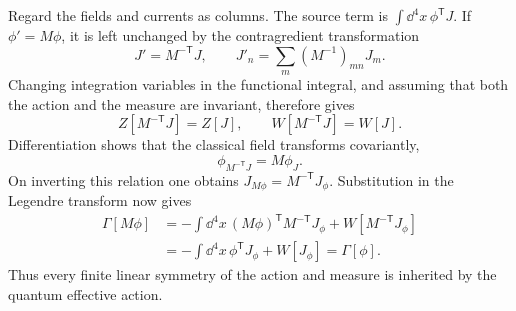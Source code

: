 \begin{enumerate}
  Regard the fields and currents as columns.  The source term is
  \(\int \dd^4x\,\phi^{\mathsf T}J\).  If
  \(\phi'=M\phi\), it is left unchanged by the contragredient
  transformation
  \[
    \boxed{J'=M^{-\mathsf T}J},
    \qquad
    J'_n=\sum_m(M^{-1})_{mn}J_m .
  \]
  Changing integration variables in the functional integral, and assuming
  that both the action and the measure are invariant, therefore gives
  \[
    Z[M^{-\mathsf T}J]=Z[J],
    \qquad
    W[M^{-\mathsf T}J]=W[J].
  \]
  Differentiation shows that the classical field transforms covariantly,
  \[
    \phi_{M^{-\mathsf T}J}=M\phi_J.
  \]
  On inverting this relation one obtains
  \(J_{M\phi}=M^{-\mathsf T}J_\phi\).  Substitution in the Legendre
  transform now gives
  \[
    \begin{split}
    \Gamma[M\phi]
      &= -\int \dd^4x\,(M\phi)^{\mathsf T}
          M^{-\mathsf T}J_\phi
         +W[M^{-\mathsf T}J_\phi]\\
      &= -\int \dd^4x\,\phi^{\mathsf T}J_\phi+W[J_\phi]
       =\Gamma[\phi].
    \end{split}
  \]
  Thus every finite linear symmetry of the action and measure is inherited
  by the quantum effective action.
\end{enumerate}
